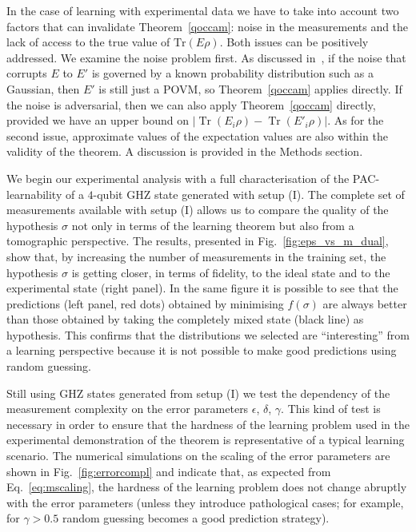 \documentclass[aps,superscriptaddress,nofootinbib,twocolumn]{revtex4-1}
\begin{document}
In the case of learning with experimental data we have to take into account two
factors that can invalidate Theorem~\ref{qoccam}: noise in the measurements and
the lack of access to the true value of $\mathrm{Tr}(E\rho)$. Both issues can be
positively addressed. We examine the noise problem first. As discussed
in~\cite{aaronson2007learnability}, if the noise that corrupts $E$ to $E'$ is
governed by a known probability distribution such as a Gaussian, then $E'$ is
still just a POVM, so Theorem~\ref{qoccam} applies directly. If the noise is
adversarial, then we can also apply Theorem~\ref{qoccam} directly, provided we
have an upper bound on $ \left\vert \operatorname*{Tr}\left(  E_{i}\rho\right)
-  \operatorname*{Tr}\left(  E'_{i}\rho\right)  \right\vert$. As for the second
issue, approximate values of the expectation values are also within the validity
of the theorem. A discussion is provided in the Methods section.

We begin our experimental analysis with a full characterisation of the PAC-learnability of a $4$-qubit GHZ state generated with setup (I). The complete set of measurements available with setup (I) allows us to compare the quality of the hypothesis $\sigma$ not only in terms of the learning theorem but also from a tomographic perspective. The results, presented in Fig.~\ref{fig:eps_vs_m_dual}, show that, by increasing the number of measurements in the training set, the hypothesis $\sigma$ is getting closer, in terms of fidelity, to the ideal state and to the experimental state (right panel). In the same figure it is possible to see that the predictions (left panel, red dots) obtained by
minimising $f(\sigma)$ are always better than those obtained by taking the
completely mixed state (black line) as hypothesis. This confirms that the distributions we selected are ``interesting'' from a learning perspective because it is not possible to make good predictions using random guessing.

Still using GHZ states generated from setup (I) we test the dependency of the measurement complexity on the error parameters $\epsilon$, $\delta$, $\gamma$. This kind of test is necessary in order to ensure that the hardness of the learning problem used in the experimental demonstration of the theorem is representative of a typical learning scenario. The numerical simulations on the scaling of the error parameters are shown in Fig.~\ref{fig:errorcompl} and indicate that, as expected from Eq.~\ref{eq:mscaling}, the hardness of the learning problem does not change abruptly with the error parameters (unless they introduce pathological cases; for example, for $\gamma>0.5$ random guessing becomes a good prediction strategy).
\end{document}
